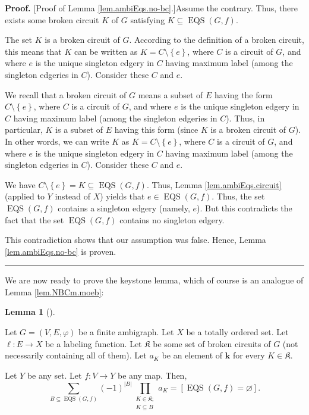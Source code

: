 \documentclass[numbers=enddot,12pt,final,onecolumn,notitlepage]{scrartcl}%
\theoremstyle{definition}
\newtheorem{lem}[theo]{Lemma}
\newenvironment{lemma}[1][]
{\begin{lem}[#1]\begin{leftbar}}
{\end{leftbar}\end{lem}}
\newenvironment{proof}[1][Proof]{\noindent\textbf{#1.} }{\ \rule{0.5em}{0.5em}}
\newenvironment{verlong}{}{}
\newenvironment{vershort}{}{}
\let\sumnonlimits\sum
\let\prodnonlimits\prod
\renewcommand{\sum}{\sumnonlimits\limits}
\renewcommand{\prod}{\prodnonlimits\limits}
\begin{document}
\begin{proof}
[Proof of Lemma \ref{lem.ambiEqs.no-bc}.]Assume the contrary. Thus, there
exists some broken circuit $K$ of $G$ satisfying $K\subseteq
\operatorname*{EQS}\left(  G,f\right)  $.

\begin{vershort}
The set $K$ is a broken circuit of $G$. According to the definition of a
broken circuit, this means that $K$ can be written as $K=C\setminus\left\{
e\right\}  $, where $C$ is a circuit of $G$, and where $e$ is the unique
singleton edgery in $C$ having maximum label (among the singleton edgeries in
$C$). Consider these $C$ and $e$.
\end{vershort}

\begin{verlong}
We recall that a broken circuit of $G$ means a subset of $E$ having the form
$C\setminus\left\{  e\right\}  $, where $C$ is a circuit of $G$, and where $e$
is the unique singleton edgery in $C$ having maximum label (among the
singleton edgeries in $C$). Thus, in particular, $K$ is a subset of $E$ having
this form (since $K$ is a broken circuit of $G$). In other words, we can write
$K$ as $K=C\setminus\left\{  e\right\}  $, where $C$ is a circuit of $G$, and
where $e$ is the unique singleton edgery in $C$ having maximum label (among
the singleton edgeries in $C$). Consider these $C$ and $e$.
\end{verlong}

We have $C\setminus\left\{  e\right\}  =K\subseteq\operatorname*{EQS}\left(
G,f\right)  $. Thus, Lemma \ref{lem.ambiEqs.circuit} (applied to $Y$ instead
of $X$) yields that $e\in\operatorname*{EQS}\left(  G,f\right)  $. Thus, the
set $\operatorname*{EQS}\left(  G,f\right)  $ contains a singleton edgery
(namely, $e$). But this contradicts the fact that the set $\operatorname*{EQS}%
\left(  G,f\right)  $ contains no singleton edgery.

This contradiction shows that our assumption was false. Hence, Lemma
\ref{lem.ambiEqs.no-bc} is proven.
\end{proof}

We are now ready to prove the keystone lemma, which of course is an analogue
of Lemma \ref{lem.NBCm.moeb}:

\begin{lemma}
\label{lem.ambiNBCm.moeb}Let $G=\left(  V,E,\varphi\right)  $ be a finite
ambigraph. Let $X$ be a totally ordered set. Let $\ell:E\rightarrow X$ be a
labeling function. Let $\mathfrak{K}$ be some set of broken circuits of $G$
(not necessarily containing all of them). Let $a_{K}$ be an element of
$\mathbf{k}$ for every $K\in\mathfrak{K}$.

Let $Y$ be any set. Let $f:V\rightarrow Y$ be any map. Then,%
\[
\sum_{B\subseteq\operatorname*{EQS}\left(  G,f\right)  }\left(  -1\right)
^{\left\vert B\right\vert }\prod_{\substack{K\in\mathfrak{K};\\K\subseteq
B}}a_{K}=\left[  \operatorname*{EQS}\left(  G,f\right)  =\varnothing\right]
.
\]

\end{lemma}
\end{document}

